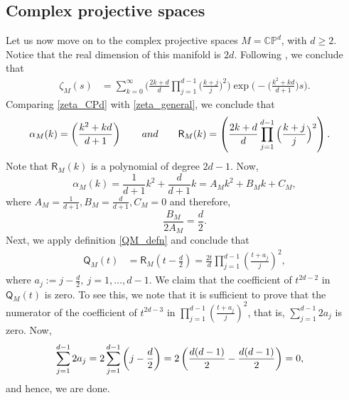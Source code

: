 \documentclass[11pt,lettersize,reqno,fullpage]{amsart}
\begin{document}
\subsection{Complex projective spaces}
Let us now move on to the complex projective spaces $M=\mathbb{CP}^d$, 
with $d \geq 2$. Notice that the real dimension of this manifold is $2d$. 
Following \cite[page 9, theorem 4.2]{Cahn}, we conclude that 
\begin{align}
\zeta_{M}(s) & = \sum_{k=0}^{\infty} \Big(\frac{2k+d}{d}\prod_{j=1}^{d-1} \Big(\frac{k+j}{j}\Big)^2\Big) 
\exp\Big(-\Big(\frac{k^2+kd}{d+1}\Big)s\Big). \label{zeta_CPd}
\end{align}
Comparing \eqref{zeta_CPd} with \eqref{zeta_general}, we conclude that 
\begin{align}
\alpha_{M}(k)& = \left(\frac{k^2+kd}{d+1}\right) \qquad \textnormal{and} \qquad 
\mathsf{R}_{M}(k) = 
\left(\frac{2k+d}{d}\prod_{j=1}^{d-1} \Big(\frac{k+j}{j}\Big)^2\right).
\end{align}
Note that $\mathsf{R}_{M}(k)$ is a polynomial of degree $2d-1$. Now, 
\[\alpha_{M}(k)=\frac{1}{d+1}k^{2}+\frac{d}{d+1}k=A_{M}k^{2}+B_{M}k+C_{M}, \]
where $A_{M}=\frac{1}{d+1}, B_{M}=\frac{d}{d+1}, C_{M}=0 $ and therefore, 
\[\frac{B_{M}}{2 A_{M}}=\frac{d}{2}. \] 
Next, we apply definition \eqref{QM_defn} and conclude that 
\begin{align}
\mathsf{Q}_{M}(t) & = \mathsf{R}_{M}\left(t-\frac{d}{2}\right)= \frac{2t}{d} \prod_{j=1}^{d-1} \left(\frac{t+a_{j}}{j} \right)^{2},
\end{align}
where $a_{j}:= j-\frac{d}{2},\ j=1,\dots, d-1 $.  We claim that the coefficient of $t^{2d-2} $ in $\mathsf{Q}_{M}(t)$ is zero. To see this, we note that it is sufficient to prove that the numerator of the coefficient of $t^{2d-3} $ in $\prod_{j=1}^{d-1} \left(\frac{t+a_{j}}{j} \right)^{2} $, that is, $\sum_{j=1}^{d-1} 2a_{j} $ is zero. Now,
\begin{equation}
\begin{aligned}
\sum_{j=1}^{d-1} 2a_{j}&=2\sum_{j=1}^{d-1} \left(j-\frac{d}{2} \right)=2 \left(\frac{d(d-1)}{2}-\frac{d(d-1)}{2} \right)=0,
\end{aligned}
\notag
\end{equation}
and hence, we are done.
%
\end{document}
